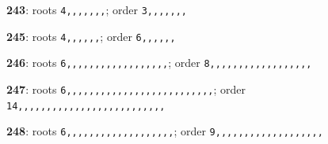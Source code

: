 \noindent \textbf{243}: roots \texttt{4,,,,,,,}; order \texttt{3,,,,,,,}\par
\noindent \textbf{245}: roots \texttt{4,,,,,,}; order \texttt{6,,,,,,}\par
\noindent \textbf{246}: roots \texttt{6,,,,,,,,,,,,,,,,,,}; order \texttt{8,,,,,,,,,,,,,,,,,,}\par
\noindent \textbf{247}: roots \texttt{6,,,,,,,,,,,,,,,,,,,,,,,,,,}; order \texttt{14,,,,,,,,,,,,,,,,,,,,,,,,,,}\par
\noindent \textbf{248}: roots \texttt{6,,,,,,,,,,,,,,,,,,,}; order \texttt{9,,,,,,,,,,,,,,,,,,,}\par
